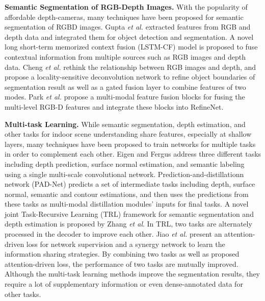 \noindent \textbf{Semantic Segmentation of RGB-Depth Images.}
%
With the popularity of affordable depth-cameras, many techniques have been proposed for semantic segmentation of RGBD images.
%
Gupta \emph{et al.} \cite{Gupta2014} extracted features from RGB and depth data and integrated them for object detection and segmentation.
%
A novel long short-term memorized context fusion (LSTM-CF) model is proposed \cite{Li2016} to fuse contextual information from multiple sources such as RGB images and depth data.
% 
Cheng \emph{et al.} \cite{Cheng2017} rethink the relationship between RGB images and depth, and propose a locality-sensitive deconvolution network to refine object boundaries of segmentation result as well as a gated fusion layer to combine features of two modes.
%
Park \emph{et al.} \cite{Park2017} propose a multi-modal feature fusion blocks for fusing the multi-level RGB-D features and integrate these blocks into RefineNet.


 
\noindent \textbf{Multi-task Learning.} 
%
While semantic segmentation, depth estimation, and other tasks for indoor scene understanding share features, especially at shallow layers, many techniques have been proposed to train networks for multiple tasks in order to complement each other.
%
Eigen and Fergus \cite{Eigen2015} address three different tasks including depth prediction, surface normal estimation, and semantic labeling using a single multi-scale convolutional network. 
%
Prediction-and-distillationn network (PAD-Net)\cite{Xu2018} predicts a set of intermediate tasks including depth, surface normal, semantic and contour estimations, and then uses the predictions from these tasks as multi-modal distillation modules' inputs for final tasks.  
%
A novel joint Task-Recursive Learning (TRL) \cite{Zhang2018} framework for semantic segmentation and depth estimation is proposed by Zhang \emph{et al}. 
%
In TRL, two tasks are alternately processed in the decoder to improve each other.
% 
Jiao \emph{et al.} \cite{Jiao2018} present an attention-driven loss for network supervision and a synergy network to learn the information sharing strategies. 
%
By combining two tasks as well as proposed attention-driven loss, the performance of two tasks are mutually improved.
%
Although the multi-task learning methods improve the segmentation results, they require a lot of supplementary information or even dense-annotated data for other tasks.

